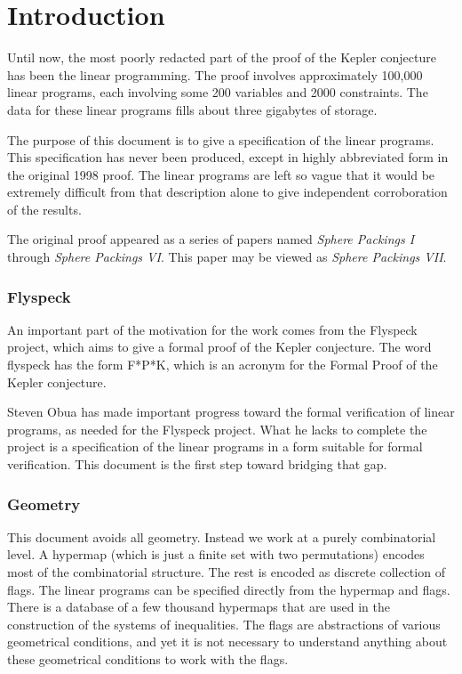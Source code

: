 


\section{Introduction}

Until now, the most poorly redacted part of the proof of the
Kepler conjecture has been the linear programming.  The proof
involves approximately 100,000 linear programs, each involving
some 200 variables and 2000 constraints.  The data for these
linear programs fills about three gigabytes of storage.

The purpose of this document is to give a specification of the
linear programs. This specification has never been produced,
except in highly abbreviated form in the original 1998 proof. The
linear programs are left so vague that it would be extremely
difficult from that description alone to give independent
corroboration of the results.

The original proof appeared as a series of papers named {\it
Sphere Packings I} through {\it Sphere Packings VI}.  This paper
may be viewed as {\it Sphere Packings VII}.

\subsubsection{Flyspeck}

An important part of the motivation for the work comes from the
Flyspeck project, which aims to give a formal proof of the Kepler
conjecture.  The word flyspeck has the form F*P*K, which is an
acronym for the Formal Proof of the Kepler conjecture.

Steven Obua has made important progress toward the formal
verification of linear programs, as needed for the Flyspeck
project.  What he lacks to complete the project is a specification
of the linear programs in a form suitable for formal verification.
This document is the first step toward bridging that gap.

\subsubsection{Geometry}

This document avoids all geometry.  Instead we work at a purely
combinatorial level.    A hypermap (which is just a finite set
with two permutations) encodes most of the combinatorial
structure.  The rest is encoded as discrete collection of flags.
The linear programs can be specified directly from the hypermap
and flags.  There is a database of a few thousand hypermaps that
are used in the construction of the systems of inequalities.  The
flags are abstractions of various geometrical conditions, and yet
it is not necessary to understand anything about these geometrical
conditions to work with the flags.

